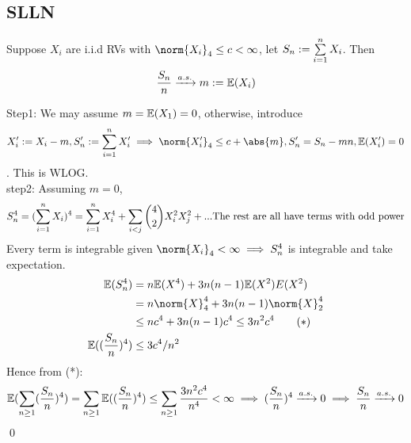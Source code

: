 \subsection*{SLLN}
\begin{dfn}Suppose $X_i$ are i.i.d RVs with $\norm{X_i}_4 \leq c < \infty$, let $S_n := \sum\limits_{i=1}^n X_i$. Then
\begin{equation*}
    \frac{S_n}{n} \xrightarrow{a.s.} m := \mathbb{E}(X_i)
\end{equation*}
\end{dfn}
\pf Step1: We may assume $m = \mathbb{E}(X_1) = 0$, otherwise, introduce \begin{equation*}
    X_i' := X_i - m, S_n' := \bigs{i=1}^n X_i' \implies \norm{X_i'}_4 \leq c + \abs{m}, S_n' = S_n - mn, \E(X_i') = 0
\end{equation*}. This is WLOG. \\
step2: Assuming $m=0$, \begin{equation*}
    S_n^4 = (\sum\limits_{i=1}^n X_i)^4 = \sum\limits_{i=1}^n X_i^4 + \sum\limits_{i<j}\binom{4}{2} X_i^2X_j^2 + ... \text{The rest are all have terms with odd power}
\end{equation*}Every term is integrable given $\norm{X_i}_4  < \infty \implies S_n^4$ is integrable and take expectation.
\begin{align*}
    \E(S_n^4) &=  n \E(X^4) + 3n(n-1)\E(X^2)E(X^2) \\
    &= n\norm{X}_4^4+ 3n(n-1)\norm{X}_2^4 \\
    &\leq n c^4 + 3n(n-1)c^4 \leq 3n^2 c^4 \qquad(*) \\
    \E((\frac{S_n}{n})^4) &\leq 3c^4/n^2
\end{align*}Hence from (*): \begin{equation*}
    \mathbb{E}(\sum\limits_{n\geq 1}(\frac{S_n}{n})^4) = \sum\limits_{n\geq 1} \mathbb{E}((\frac{S_n}{n})^4) \leq \sum\limits_{n\geq 1} \frac{3n^2c^4}{n^4} < \infty \implies (\frac{S_n}{n})^4 \xrightarrow{a.s.} 0 \implies \frac{S_n}{n} \xrightarrow{a.s.} 0
\end{equation*}\qed









\newpage
